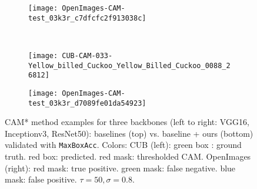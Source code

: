\documentclass[twocolumn]{article}
\newcommand\maxboxacc{\texttt{MaxBoxAcc}\xspace}
\theoremstyle{definition}
\begin{document}
\begin{figure*}
     \hfill
     \begin{subfigure}[b]{0.49\textwidth}
         \centering
         \texttt{[image: OpenImages-CAM-test\_03k3r\_c7dfcfc2f913038c]}
     \end{subfigure}
     \\
     \vspace{0.1cm}
     \begin{subfigure}[b]{0.49\textwidth}
         \centering
         \texttt{[image: CUB-CAM-033-Yellow\_billed\_Cuckoo\_Yellow\_Billed\_Cuckoo\_0088\_26812]}
     \end{subfigure}
     \hfill
     \begin{subfigure}[b]{0.49\textwidth}
         \centering
         \texttt{[image: OpenImages-CAM-test\_03k3r\_d7089fe01da54923]}
     \end{subfigure}
        \caption{CAM* method examples for three backbones (left to right: VGG16, Inceptionv3, ResNet50): baselines (top) vs. baseline + ours (bottom)  validated with \maxboxacc. Colors: CUB (left): green box : ground truth. red box: predicted. red mask: thresholded CAM. OpenImages (right): red mask: true positive. green mask: false negative. blue mask: false positive. ${\tau=50, \sigma=0.8}$.}
        \label{fig:cam-cub-openim-example-pred}
\end{figure*}
\end{document}

